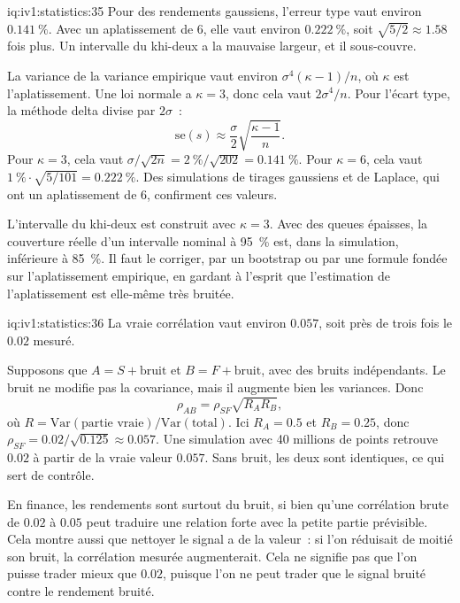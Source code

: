 \begin{solution}{iq:iv1:statistics:35}
Pour des rendements gaussiens, l'erreur type vaut environ $0.141~\%$. Avec un aplatissement de 6, elle vaut environ $0.222~\%$, soit $\sqrt{5/2} \approx 1.58$ fois plus. Un intervalle du khi-deux a la mauvaise largeur, et il sous-couvre.

La variance de la variance empirique vaut environ $\sigma^4(\kappa - 1)/n$, où $\kappa$ est l'aplatissement. Une loi normale a $\kappa = 3$, donc cela vaut $2\sigma^4/n$. Pour l'écart type, la méthode delta divise par $2\sigma$~:
\[
\mathrm{se}(s) \approx \frac{\sigma}{2}\sqrt{\frac{\kappa - 1}{n}}.
\]
Pour $\kappa = 3$, cela vaut $\sigma/\sqrt{2n} = 2~\%/\sqrt{202} = 0.141~\%$. Pour $\kappa = 6$, cela vaut $1~\% \cdot \sqrt{5/101} = 0.222~\%$. Des simulations de tirages gaussiens et de Laplace, qui ont un aplatissement de 6, confirment ces valeurs.

L'intervalle du khi-deux est construit avec $\kappa = 3$. Avec des queues épaisses, la couverture réelle d'un intervalle nominal à 95~\% est, dans la simulation, inférieure à 85~\%. Il faut le corriger, par un bootstrap ou par une formule fondée sur l'aplatissement empirique, en gardant à l'esprit que l'estimation de l'aplatissement est elle-même très bruitée.

\end{solution}

\begin{solution}{iq:iv1:statistics:36}
La vraie corrélation vaut environ $0.057$, soit près de trois fois le $0.02$ mesuré.

Supposons que $A = S + \text{bruit}$ et $B = F + \text{bruit}$, avec des bruits indépendants. Le bruit ne modifie pas la covariance, mais il augmente bien les variances. Donc
\[
\rho_{AB} = \rho_{SF}\sqrt{R_A R_B},
\]
où $R = \mathrm{Var}(\text{partie vraie})/\mathrm{Var}(\text{total})$. Ici $R_A = 0.5$ et $R_B = 0.25$, donc $\rho_{SF} = 0.02/\sqrt{0.125} \approx 0.057$. Une simulation avec 40 millions de points retrouve $0.02$ à partir de la vraie valeur $0.057$. Sans bruit, les deux sont identiques, ce qui sert de contrôle.

En finance, les rendements sont surtout du bruit, si bien qu'une corrélation brute de $0.02$ à $0.05$ peut traduire une relation forte avec la petite partie prévisible. Cela montre aussi que nettoyer le signal a de la valeur~: si l'on réduisait de moitié son bruit, la corrélation mesurée augmenterait. Cela ne signifie pas que l'on puisse trader mieux que $0.02$, puisque l'on ne peut trader que le signal bruité contre le rendement bruité.

\end{solution}

